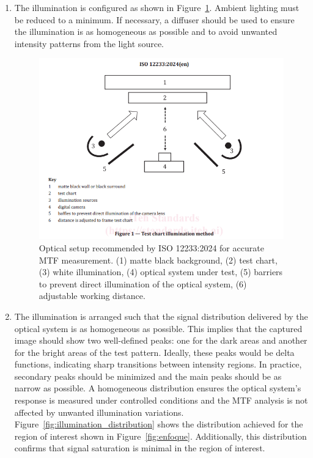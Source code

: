 \begin{enumerate}
    \item The illumination is configured as shown in Figure~\ref{fig:srf_motaje}. Ambient lighting must be reduced to a minimum. If necessary, a diffuser should be used to ensure the illumination is as homogeneous as possible and to avoid unwanted intensity patterns from the light source.
    
    \begin{figure}[H]
        \centering
        \includegraphics[trim=20mm 50mm 20mm 0mm, clip, width=0.7\linewidth]{Figures/C3/iso 12233 montaje.png}
        \caption{Optical setup recommended by ISO 12233:2024 for accurate MTF measurement. (1) matte black background, (2) test chart, (3) white illumination, (4) optical system under test, (5) barriers to prevent direct illumination of the optical system, (6) adjustable working distance.}
        \label{fig:srf_motaje}
    \end{figure}

    \item The illumination is arranged such that the signal distribution delivered by the optical system is as homogeneous as possible. This implies that the captured image should show two well-defined peaks: one for the dark areas and another for the bright areas of the test pattern. Ideally, these peaks would be delta functions, indicating sharp transitions between intensity regions. In practice, secondary peaks should be minimized and the main peaks should be as narrow as possible. A homogeneous distribution ensures the optical system’s response is measured under controlled conditions and the MTF analysis is not affected by unwanted illumination variations. Figure~\ref{fig:illumination_distribution} shows the distribution achieved for the region of interest shown in Figure~\ref{fig:enfoque}. Additionally, this distribution confirms that signal saturation is minimal in the region of interest.


\end{enumerate}
